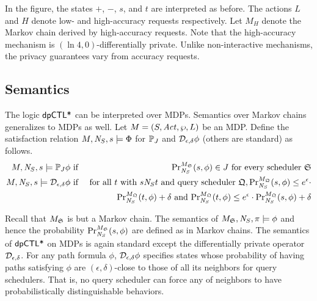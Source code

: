 In the figure, the states $+$,
$-$, $s$, and $t$ are interpreted as before. The actions $L$ and $H$
denote low- and high-accuracy requests respectively. Let $M_H$ denote
the Markov chain derived by high-accuracy requests.
Note that the high-accuracy mechanism is $(\ln 4,0)$-differentially private.
Unlike non-interactive mechanisms, the privacy guarantees vary from accuracy requests.



\subsection{Semantics}
The logic $\dpCTLstar$ can be interpreted over MDPs. Semantics over Markov chains generalizes to MDPs as well. %
Let $M = (S, \Act, \wp, L)$ be an MDP. Define the satisfaction
relation $M, \neighbor{S}, s \models \Phi$ for $\PJ{J}$ and $\dpriv{\epsilon}{\delta} \phi$ (others are standard) as follows.
\begin{eqnarray*}
  M, \neighbor{S}, s \models \PJ{J} \phi
  & \textmd{ if } &
  \myPr{s}{M_{\scheduler{S}}}{\neighbor{S}}{\phi} \in J
  \textmd{ for every scheduler } \scheduler{S}\\
  M, \neighbor{S}, s \models \dpriv{\epsilon}{\delta} \phi
  & \textmd{ if } &
  \textmd{for all } t \textmd{ with } s \neighbor{S} t \textmd{ and
   query scheduler } \scheduler{Q},
   \myPr{s}{M_{\scheduler{Q}}}{\neighbor{S}}{\phi} \leq
  e^{\epsilon} \cdot
   \\
  & &
   \myPr{t}{M_{\scheduler{Q}}}{\neighbor{S}}{\phi} + \delta
   \textmd{ and }
   \myPr{t}{M_{\scheduler{Q}}}{\neighbor{S}}{\phi} \leq e^{\epsilon} \cdot
   \myPr{s}{M_{\scheduler{Q}}}{\neighbor{S}}{\phi} + \delta
\end{eqnarray*}

Recall that $M_{\scheduler{S}}$ is but a Markov chain. The semantics
of $M_{\scheduler{S}}, \neighbor{S}, \pi \models \phi$ and hence the
probability $\myPr{s}{M_{\scheduler{S}}}{\neighbor{S}}{\phi}$ are
defined as in Markov chains.
The semantics of $\dpCTLstar$ on MDPs
is again standard except the differentially private operator
$\dpriv{\epsilon}{\delta}$. For any path formula $\phi$,
$\dpriv{\epsilon}{\delta} \phi$ specifies states whose probability
of having paths satisfying $\phi$ are $(\epsilon, \delta)$-close to
those of all its neighbors for query schedulers. That is, no
query scheduler can force any of neighbors to have
probabilistically distinguishable behaviors.

